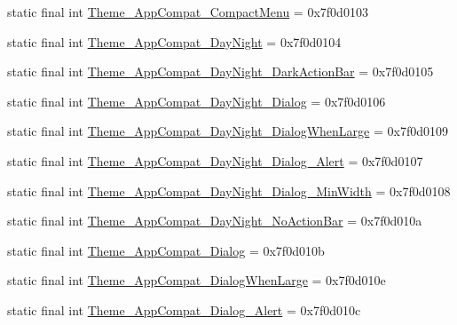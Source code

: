 \begin{DoxyCompactItemize}
\item 
static final int \mbox{\hyperlink{classandroid_1_1support_1_1v7_1_1appcompat_1_1_r_1_1style_af47c390e032a3ca9e7d85968a3f4fa18}{Theme\+\_\+\+App\+Compat\+\_\+\+Compact\+Menu}} = 0x7f0d0103
\item 
static final int \mbox{\hyperlink{classandroid_1_1support_1_1v7_1_1appcompat_1_1_r_1_1style_a0bd87a3cb5e158003deb1020c305c307}{Theme\+\_\+\+App\+Compat\+\_\+\+Day\+Night}} = 0x7f0d0104
\item 
static final int \mbox{\hyperlink{classandroid_1_1support_1_1v7_1_1appcompat_1_1_r_1_1style_a21219f3ff51227951dcff1c9bd11f3bb}{Theme\+\_\+\+App\+Compat\+\_\+\+Day\+Night\+\_\+\+Dark\+Action\+Bar}} = 0x7f0d0105
\item 
static final int \mbox{\hyperlink{classandroid_1_1support_1_1v7_1_1appcompat_1_1_r_1_1style_a29dc92c08e480c08989382431640f698}{Theme\+\_\+\+App\+Compat\+\_\+\+Day\+Night\+\_\+\+Dialog}} = 0x7f0d0106
\item 
static final int \mbox{\hyperlink{classandroid_1_1support_1_1v7_1_1appcompat_1_1_r_1_1style_afba4a738702f7eac7bbd3b32e0c5b83e}{Theme\+\_\+\+App\+Compat\+\_\+\+Day\+Night\+\_\+\+Dialog\+When\+Large}} = 0x7f0d0109
\item 
static final int \mbox{\hyperlink{classandroid_1_1support_1_1v7_1_1appcompat_1_1_r_1_1style_a3929f888539feb62f14e6aca27d3737f}{Theme\+\_\+\+App\+Compat\+\_\+\+Day\+Night\+\_\+\+Dialog\+\_\+\+Alert}} = 0x7f0d0107
\item 
static final int \mbox{\hyperlink{classandroid_1_1support_1_1v7_1_1appcompat_1_1_r_1_1style_ac9786b603f31fd7a6c80b2549e9d238f}{Theme\+\_\+\+App\+Compat\+\_\+\+Day\+Night\+\_\+\+Dialog\+\_\+\+Min\+Width}} = 0x7f0d0108
\item 
static final int \mbox{\hyperlink{classandroid_1_1support_1_1v7_1_1appcompat_1_1_r_1_1style_a5f566be860fdec27a832a1cb72e005e4}{Theme\+\_\+\+App\+Compat\+\_\+\+Day\+Night\+\_\+\+No\+Action\+Bar}} = 0x7f0d010a
\item 
static final int \mbox{\hyperlink{classandroid_1_1support_1_1v7_1_1appcompat_1_1_r_1_1style_aa947f8c647b055078c8ff2b8c77e1729}{Theme\+\_\+\+App\+Compat\+\_\+\+Dialog}} = 0x7f0d010b
\item 
static final int \mbox{\hyperlink{classandroid_1_1support_1_1v7_1_1appcompat_1_1_r_1_1style_a254c8c935e481bde88dba99a52d72059}{Theme\+\_\+\+App\+Compat\+\_\+\+Dialog\+When\+Large}} = 0x7f0d010e
\item 
static final int \mbox{\hyperlink{classandroid_1_1support_1_1v7_1_1appcompat_1_1_r_1_1style_ac75a05a56cc31d2f09bcb4f4333ce197}{Theme\+\_\+\+App\+Compat\+\_\+\+Dialog\+\_\+\+Alert}} = 0x7f0d010c

\end{DoxyCompactItemize}
